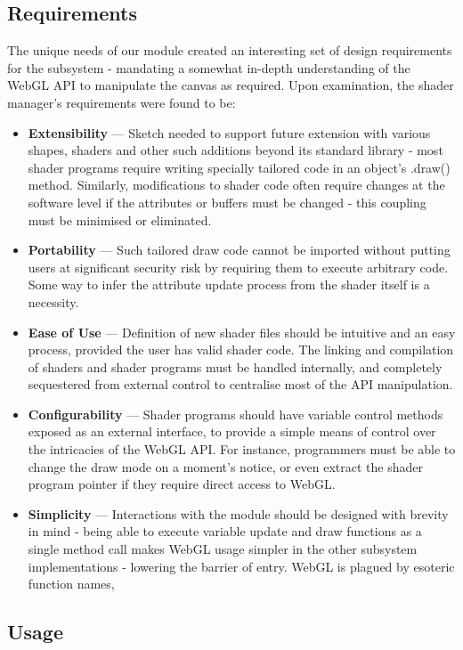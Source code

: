 \documentclass{l3proj}
\begin{document}
\subsection{Requirements}
\label{arch-shad-req}
The unique needs of our module created an interesting set of design requirements for the subsystem - mandating a somewhat in-depth understanding of the WebGL API to manipulate the canvas as required. Upon examination, the shader manager's requirements were found to be:
\begin{itemize}
\item \textbf{Extensibility} --- Sketch needed to support future extension with various shapes, shaders and other such additions beyond its standard library - most shader programs require writing specially tailored code in an object's .draw() method. Similarly, modifications to shader code often require changes at the software level if the attributes or buffers must be changed - this coupling must be minimised or eliminated.
\item \textbf{Portability} --- Such tailored draw code cannot be imported without putting users at significant security risk by requiring them to execute arbitrary code. Some way to infer the attribute update process from the shader itself is a necessity.
\item \textbf{Ease of Use} --- Definition of new shader files should be intuitive and an easy process, provided the user has valid shader code. The linking and compilation of shaders and shader programs must be handled internally, and completely sequestered from external control to centralise most of the API manipulation.
\item \textbf{Configurability} --- Shader programs should have variable control methods exposed as an external interface, to provide a simple means of control over the intricacies of the WebGL API. For instance, programmers must be able to change the draw mode on a moment's notice, or even extract the shader program pointer if they require direct access to WebGL.
\item \textbf{Simplicity} --- Interactions with the module should be designed with brevity in mind - being able to execute variable update and draw functions as a single method call makes WebGL usage simpler in the other subsystem implementations - lowering the barrier of entry. WebGL is plagued by esoteric function names, 
\end{itemize}

\subsection{Usage}
\label{arch-shad-use}
\end{document}
